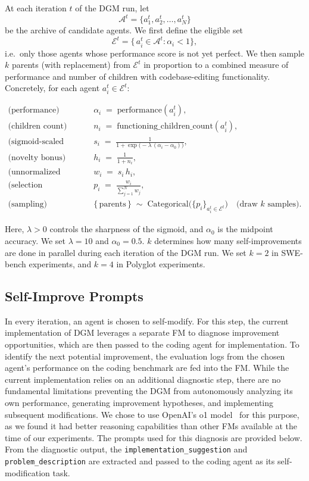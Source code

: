 At each iteration \(t\) of the DGM run, let
\[
\mathcal{A}^t = \{a_1^t, a_2^t, \dots, a_N^t\}
\]
be the archive of candidate agents.  We first define the eligible set
\[
\mathcal{E}^t = \bigl\{\,a_i^t \in \mathcal{A}^t : \alpha_i < 1 \bigr\},
\]
i.e.\ only those agents whose performance score is not yet perfect. We then sample \(k\) parents (with replacement) from \(\mathcal{E}^t\) in proportion to a combined measure of performance and number of children with codebase-editing functionality. Concretely, for each agent \(a_i^t \in \mathcal{E}^t\):

\begin{align}
\text{(performance)}\quad & \alpha_i \;=\; \mathrm{performance}(a_i^t),
\\
\text{(children count)}\quad & n_i \;=\; \mathrm{functioning\_children\_count}(a_i^t),
\\[6pt]
\text{(sigmoid‐scaled performance)}\quad
& s_i \;=\; \frac{1}{1 + \exp\!\bigl(-\lambda\,(\alpha_i - \alpha_0)\bigr)},
\\[4pt]
\text{(novelty bonus)}\quad
& h_i \;=\; \frac{1}{1 + n_i},
\\[4pt]
\text{(unnormalized weight)}\quad
& w_i \;=\; s_i\,h_i,
\\[4pt]
\text{(selection probability)}\quad
& p_i \;=\; \frac{w_i}{\sum_{j=1}^{N} w_j},
\\[8pt]
\text{(sampling)}\quad
& \{\,\text{parents}\,\} \;\sim\; \mathrm{Categorical}\bigl(\{p_i\}_{a_i^t \in \mathcal{E}^t}\bigr)\quad\text{(draw \(k\) samples).}
\end{align}

Here, \(\lambda>0\) controls the sharpness of the sigmoid, and \(\alpha_0\) is the midpoint accuracy. We set \(\lambda=10\) and \(\alpha_0=0.5\). \(k\) determines how many self-improvements are done in parallel during each iteration of the DGM run. We set \(k=2\) in SWE-bench experiments, and \(k=4\) in Polyglot experiments.

\subsection{Self-Improve Prompts}
\label{app:selfimprove-prompts}

In every iteration, an agent is chosen to self-modify. For this step, the current implementation of DGM leverages a separate FM to diagnose improvement opportunities, which are then passed to the coding agent for implementation. To identify the next potential improvement, the evaluation logs from the chosen agent's performance on the coding benchmark are fed into the FM. While the current implementation relies on an additional diagnostic step, there are no fundamental limitations preventing the DGM from autonomously analyzing its own performance, generating improvement hypotheses, and implementing subsequent modifications. We chose to use OpenAI's o1 model~\citep{openai2024o1} for this purpose, as we found it had better reasoning capabilities than other FMs available at the time of our experiments. The prompts used for this diagnosis are provided below. From the diagnostic output, the \texttt{implementation\_suggestion} and \texttt{problem\_description} are extracted and passed to the coding agent as its self-modification task.

